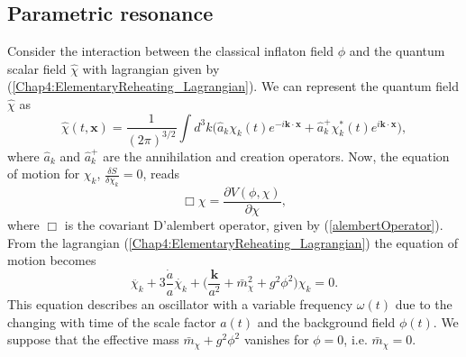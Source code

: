 \documentclass[11pt,a4paper,twoside]{book}
\begin{document}
\subsection{Parametric resonance}
Consider the interaction between the classical inflaton field $\phi$ and the quantum scalar field $\hat{\chi}$ with lagrangian given by (\ref{Chap4:ElementaryReheating_Lagrangian}). We can represent the quantum field $\hat{\chi}$ as 
\begin{equation}
	\label{Chap4:RepresentationScalarField}
	\hat{\chi}(t,\textbf{x}) = \frac{1}{(2\pi)^{3/2}}\int d^{3}k \Bigg(\hat{a}_{k} \chi_{k}(t)e^{-i\textbf{k}\cdot\textbf{x}} + \hat{a}^{+}_{k} \chi_{k}^{*}(t)e^{i\textbf{k}\cdot\textbf{x}}\Bigg),
\end{equation}
where $ \hat{a}_{k} $ and $ \hat{a}^{+}_{k} $ are the annihilation and creation operators. Now, the equation of motion for $\chi_{k}$, $ \frac{\delta S}{\delta \chi_{k}}=0 $, reads
\begin{equation}
	\label{Chap4:elemReheating_eomChi1}
	\Box \chi = \frac{\partial V(\phi,\chi)}{\partial \chi},
\end{equation}
where $\Box$ is the covariant D'alembert operator, given by (\ref{alembertOperator}). From the lagrangian (\ref{Chap4:ElementaryReheating_Lagrangian}) the equation of motion becomes
\begin{equation}
	\label{Chap4:elemReheating_eomChi}
	\ddot{\chi_{k}} + 3\frac{\dot{a}}{a}\dot{\chi_{k}} + \Bigg(\frac{\textbf{k}}{a^{2}} + \bar{m}^{2}_{\chi} + g^{2}\phi^{2}\Bigg)\chi_{k}=0.
\end{equation}
This equation describes an oscillator with a variable frequency $\omega(t)$ due to the changing with time of the scale factor $ a(t) $ and the background field $ \phi(t) $. We suppose that the effective mass $ \bar{m}_{\chi} + g^{2}\phi^{2} $ vanishes for $ \phi=0 $, i.e. $  \bar{m}_{\chi}=0 $.
\end{document}
